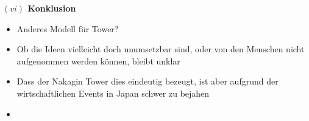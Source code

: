 \documentclass[a4paper, 12pt]{article}
\begin{document}
\begin{onehalfspace}


\vspace{5mm}
\noindent\textbf{$(vi)$ Konklusion}

\begin{itemize}
  \item Anderes Modell für Tower?
  \item Ob die Ideen vielleicht doch unumsetzbar sind, oder von den Menschen nicht aufgenommen werden können, bleibt unklar
  \item Dass der Nakagin Tower dies eindeutig bezeugt, ist aber aufgrund der wirtschaftlichen Events in Japan schwer zu bejahen
  \item 
\end{itemize}


\end{onehalfspace}
\printbibliography

%
\end{document}
